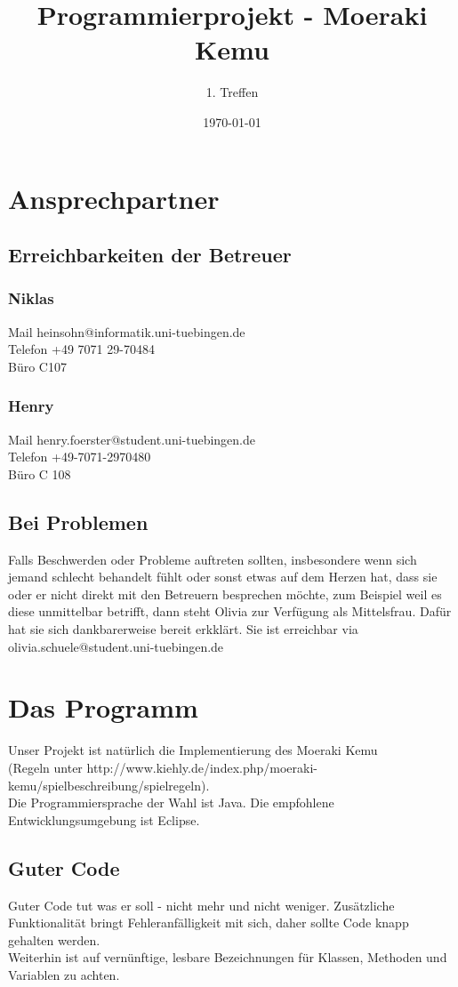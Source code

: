 \documentclass{article}
\begin{document}
\title{Programmierprojekt - Moeraki Kemu}
\author{1. Treffen}
\date{\today}
\maketitle

\section*{Ansprechpartner}
\subsection*{Erreichbarkeiten der Betreuer} 
\subsubsection*{Niklas}
Mail heinsohn@informatik.uni-tuebingen.de \\
Telefon +49 7071 29-70484 \\
Büro C107
\subsubsection*{Henry}
Mail henry.foerster@student.uni-tuebingen.de\\
Telefon +49-7071-2970480\\
Büro C 108
\subsection*{Bei Problemen}
Falls Beschwerden oder Probleme auftreten sollten, insbesondere wenn sich jemand schlecht behandelt fühlt oder sonst etwas auf dem Herzen hat, dass sie oder er nicht direkt mit den Betreuern besprechen möchte, zum Beispiel weil es diese unmittelbar betrifft, dann steht Olivia zur Verfügung als Mittelsfrau. Dafür hat sie sich dankbarerweise bereit erkklärt. Sie ist erreichbar via olivia.schuele@student.uni-tuebingen.de

\section*{Das Programm}
Unser Projekt ist natürlich die Implementierung des Moeraki Kemu \\
(Regeln unter http://www.kiehly.de/index.php/moeraki-kemu/spielbeschreibung/spielregeln). \\
Die Programmiersprache der Wahl ist Java. Die empfohlene Entwicklungsumgebung ist Eclipse.
\subsection*{Guter Code}
Guter Code tut was er soll - nicht mehr und nicht weniger. Zusätzliche Funktionalität bringt Fehleranfälligkeit mit sich, daher sollte Code knapp gehalten werden.\\
Weiterhin ist auf vernünftige, lesbare Bezeichnungen für Klassen, Methoden und Variablen zu achten.
\end{document}
